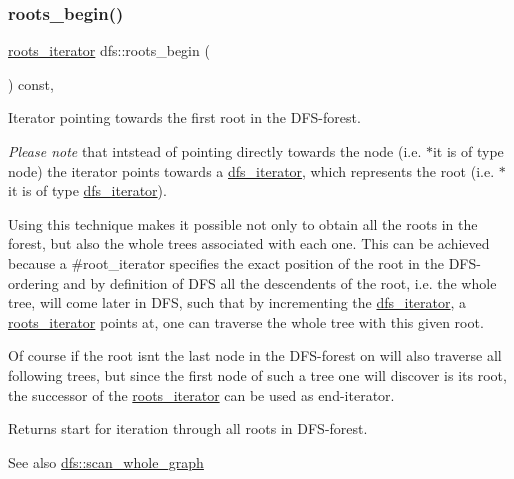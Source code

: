 \subsubsection{\texorpdfstring{roots\+\_\+begin()}{roots\_begin()}}
{\footnotesize\ttfamily \mbox{\hyperlink{classdfs_a1ea6e8eb2766ac95ac48a8523359065a}{roots\+\_\+iterator}} dfs\+::roots\+\_\+begin (\begin{DoxyParamCaption}{ }\end{DoxyParamCaption}) const\hspace{0.3cm}{\ttfamily [inline]}, {\ttfamily [inherited]}}



Iterator pointing towards the first root in the D\+F\+S-\/forest. 

{\itshape Please note} that intstead of pointing directly towards the node (i.\+e. {\ttfamily $\ast$it} is of type node) the iterator points towards a \mbox{\hyperlink{classdfs_a15fe023a5a1f7ddda00f3d87110d9a32}{dfs\+\_\+iterator}}, which represents the root (i.\+e. {\ttfamily $\ast$it} is of type \mbox{\hyperlink{classdfs_a15fe023a5a1f7ddda00f3d87110d9a32}{dfs\+\_\+iterator}}).

Using this technique makes it possible not only to obtain all the roots in the forest, but also the whole trees associated with each one. This can be achieved because a \#root\+\_\+iterator specifies the exact position of the root in the D\+F\+S-\/ordering and by definition of D\+FS all the descendents of the root, i.\+e. the whole tree, will come later in D\+FS, such that by incrementing the \mbox{\hyperlink{classdfs_a15fe023a5a1f7ddda00f3d87110d9a32}{dfs\+\_\+iterator}}, a \mbox{\hyperlink{classdfs_a1ea6e8eb2766ac95ac48a8523359065a}{roots\+\_\+iterator}} points at, one can traverse the whole tree with this given root.

Of course if the root isn\textquotesingle{}t the last node in the D\+F\+S-\/forest on will also traverse all following trees, but since the first node of such a tree one will discover is its root, the successor of the \mbox{\hyperlink{classdfs_a1ea6e8eb2766ac95ac48a8523359065a}{roots\+\_\+iterator}} can be used as end-\/iterator.

\begin{DoxyReturn}{Returns}
start for iteration through all roots in D\+F\+S-\/forest. 
\end{DoxyReturn}
\begin{DoxySeeAlso}{See also}
\mbox{\hyperlink{classdfs_aa7c864a6f3a120720138b187b3ed95b5}{dfs\+::scan\+\_\+whole\+\_\+graph}} 
\end{DoxySeeAlso}


